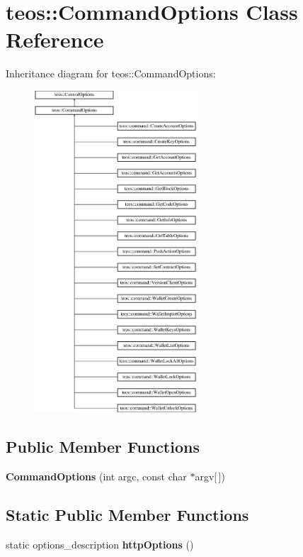 \hypertarget{classteos_1_1_command_options}{}\section{teos\+:\+:Command\+Options Class Reference}
\label{classteos_1_1_command_options}
Inheritance diagram for teos\+:\+:Command\+Options\+:\begin{figure}[H]
\begin{center}
\leavevmode
\includegraphics[height=12.000000cm]{classteos_1_1_command_options}
\end{center}
\end{figure}
\subsection*{Public Member Functions}
\begin{DoxyCompactItemize}
\item 
\mbox{\label{classteos_1_1_command_options_aa0fc4c9930fe2bf479abdbe187a4ca65}} 
{\bfseries Command\+Options} (int argc, const char $\ast$argv\mbox{[}$\,$\mbox{]})
\end{DoxyCompactItemize}
\subsection*{Static Public Member Functions}
\begin{DoxyCompactItemize}
\item 
\mbox{\label{classteos_1_1_command_options_a64481990f4f43f58491bb5def15006c5}} 
static options\+\_\+description {\bfseries http\+Options} ()
\end{DoxyCompactItemize}
